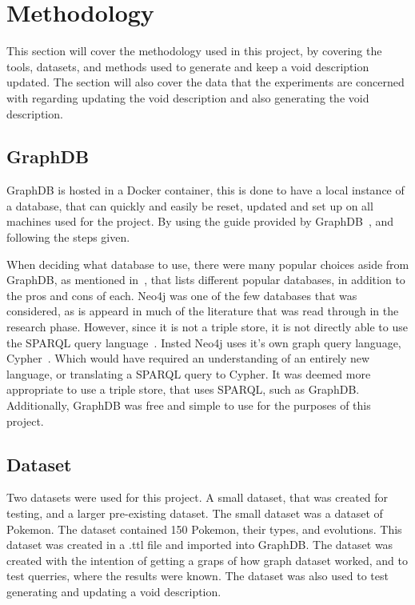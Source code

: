 \section{Methodology}\label{sec:methodology}

This section will cover the methodology used in this project, by covering the tools, datasets, and methods used to generate and keep a \gls{void} description updated. The section will also cover the data that the experiments are concerned with regarding updating the void description and also generating the void description.

\subsection{GraphDB}\label{sec:graphdb}
GraphDB is hosted in a Docker container, this is done to have a local instance of a database, that can quickly and easily be reset, updated and set up on all machines used for the project. By using the guide provided by GraphDB~\cite{docker-graphDB}, and following the steps given.

When deciding what database to use, there were many popular choices aside from GraphDB, as mentioned in~\cite{best-graph-databases}, that lists different popular databases, in addition to the pros and cons of each. Neo4j was one of the few databases that was considered, as is appeard in much of the literature that was read through in the research phase. However, since it is not a triple store, it is not directly able to use the SPARQL query language~\cite{neo4j:-a-reasonable-RDF-graph-database}. Insted Neo4j uses it's own graph query language, Cypher~\cite{cypher-query-language}. Which would have required an understanding of an entirely new language, or translating a SPARQL query to Cypher. It was deemed more appropriate to use a triple store, that uses SPARQL, such as GraphDB. Additionally, GraphDB was free and simple to use for the purposes of this project.

\subsection{Dataset}\label{sec:dataset}
Two datasets were used for this project. A small dataset, that was created for testing, and a larger pre-existing dataset. The small dataset was a dataset of Pokemon. The dataset contained 150 Pokemon, their types, and evolutions. This dataset was created in a .ttl file and imported into GraphDB. The dataset was created with the intention of getting a graps of how graph dataset worked, and to test querries, where the results were known. The dataset was also used to test generating and updating a \gls{void} description.


